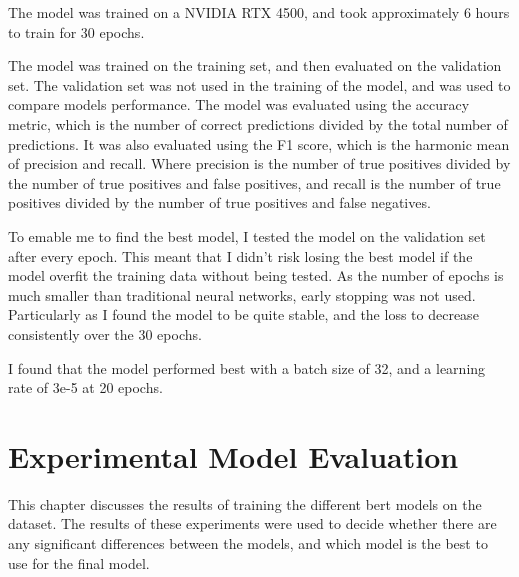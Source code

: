 \documentclass{UoYCSproject}
\begin{document}
    The model was trained on a NVIDIA RTX 4500, and took approximately 6 hours to train for 30 epochs. \par

    The model was trained on the training set, and then evaluated on the validation set.
    The validation set was not used in the training of the model, and was used to compare models performance.
    The model was evaluated using the accuracy metric, which is the number of correct predictions divided by the total number of predictions.
    It was also evaluated using the F1 score, which is the harmonic mean of precision and recall.
    Where precision is the number of true positives divided by the number of true positives and false positives, and recall is the number of true positives divided by the number of true positives and false negatives.

    To emable me to find the best model, I tested the model on the validation set after every epoch.
    This meant that I didn't risk losing the best model if the model overfit the training data without being tested.
    As the number of epochs is much smaller than traditional neural networks, early stopping was not used.
    Particularly as I found the model to be quite stable, and the loss to decrease consistently over the 30 epochs.

    I found that the model performed best with a batch size of 32, and a learning rate of 3e-5 at 20 epochs.

    \chapter{Experimental Model Evaluation}
    \label{ch:experimental-model-evaluation}
    This chapter discusses the results of training the different bert models on the dataset.
    The results of these experiments were used to decide whether there are any significant differences between the models, and which model is the best to use for the final model.
\end{document}
